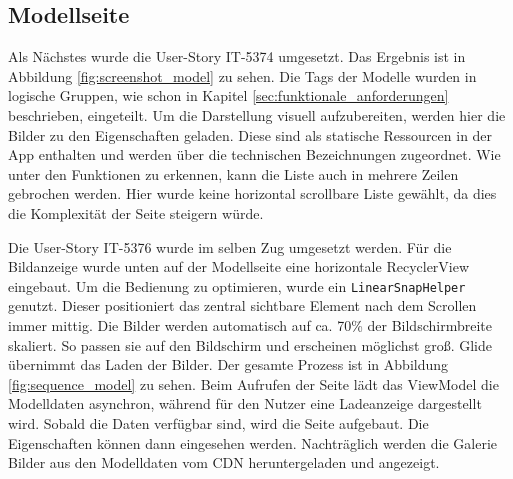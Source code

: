 \FloatBarrier
\subsection{Modellseite}


Als Nächstes wurde die User-Story IT-5374 umgesetzt. Das Ergebnis ist in Abbildung \ref{fig:screenshot_model} zu sehen. Die Tags der Modelle wurden in logische Gruppen, wie schon in Kapitel \ref{sec:funktionale_anforderungen} beschrieben, eingeteilt. Um die Darstellung visuell aufzubereiten, werden hier die Bilder zu den Eigenschaften geladen. Diese sind als statische Ressourcen in der App enthalten und werden über die technischen Bezeichnungen zugeordnet. Wie unter den Funktionen zu erkennen, kann die Liste auch in mehrere Zeilen gebrochen werden. Hier wurde keine horizontal scrollbare Liste gewählt, da dies die Komplexität der Seite steigern würde.

Die User-Story IT-5376 wurde im selben Zug umgesetzt werden. Für die Bildanzeige wurde unten auf der Modellseite eine horizontale RecyclerView eingebaut. Um die Bedienung zu optimieren, wurde ein \texttt{LinearSnapHelper} genutzt. Dieser positioniert das zentral sichtbare Element nach dem Scrollen immer mittig. Die Bilder werden automatisch auf ca. {70\%} der Bildschirmbreite skaliert. So passen sie auf den Bildschirm und erscheinen möglichst groß. Glide übernimmt das Laden der Bilder. Der gesamte Prozess ist in Abbildung \ref{fig:sequence_model} zu sehen. Beim Aufrufen der Seite lädt das ViewModel die Modelldaten asynchron, während für den Nutzer eine Ladeanzeige dargestellt wird. Sobald die Daten verfügbar sind, wird die Seite aufgebaut. Die Eigenschaften können dann eingesehen werden. Nachträglich werden die Galerie Bilder aus den Modelldaten vom \gls{CDN} heruntergeladen und angezeigt.

